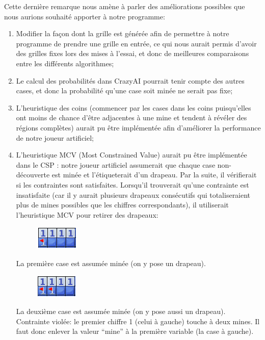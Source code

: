 \documentclass{article}
\begin{document}
Cette dernière remarque nous amène à parler des améliorations possibles que nous aurions souhaité apporter à notre programme:
\begin{enumerate}
        \item Modifier la façon dont la grille est générée afin de permettre à notre programme de prendre une grille en entrée, ce qui nous aurait permis d’avoir des grilles fixes lors des mises à l’essai, et donc de meilleures comparaisons entre les différents algorithmes;
        \item Le calcul des probabilités dans CrazyAI pourrait tenir compte des autres cases, et donc la probabilité qu’une case soit minée ne serait pas fixe;
        \item L’heuristique des coins (commencer par les cases dans les coins puisqu’elles ont moins de chance d’être adjacentes à une mine et tendent à révéler des régions complètes) aurait pu être implémentée afin d’améliorer la performance de notre joueur artificiel;
        \item L’heuristique MCV (Most Constrained Value) aurait pu être implémentée dans le CSP : notre joueur artificiel assumerait que chaque case non-découverte est minée et l’étiqueterait d’un drapeau. Par la suite, il vérifierait si les contraintes sont satisfaites. Lorsqu’il trouverait qu’une contrainte est insatisfaite (car il y aurait plusieurs drapeaux consécutifs qui totaliseraient plus de mines possibles que les chiffres correspondants), il utiliserait l’heuristique MCV pour retirer des drapeaux:

\begin{figure}[h!]
  \centering
  \includegraphics[scale=.5]{./demineur_4.png}
\end{figure}
La première case est assumée minée (on y pose un drapeau).

\begin{figure}[h!]
  \centering
  \includegraphics[scale=.5]{./demineur_5.png}
\end{figure}

La deuxième case est assumée minée (on y pose aussi un drapeau).
Contrainte violée: le premier chiffre 1 (celui à gauche) touche à deux mines. 
Il faut donc enlever la valeur “mine” à la première variable (la case à gauche).


\end{enumerate}
\end{document}
